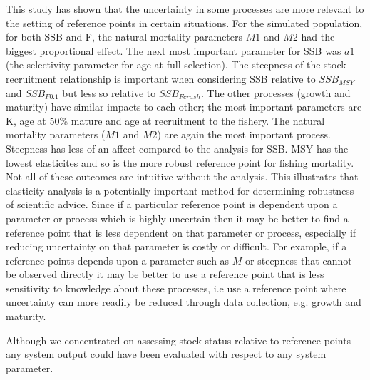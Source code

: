 \documentclass{pnastwo}
\begin{document}
\begin{article}
This study has shown that the uncertainty in some processes are more relevant to
the setting of reference points in certain situations. For the simulated population,
for both SSB and F, the natural mortality parameters $M1$ and $M2$ had the biggest
proportional effect. The next most important parameter for SSB was $a1$ (the selectivity
parameter for age at full selection). The steepness of the stock recruitment relationship
is important when considering SSB relative to $SSB_{MSY}$ and $SSB_{F0.1}$ but less
so relative to $SSB_{Fcrash}$. The other processes (growth and maturity) have similar
impacts to each other; the most important parameters are K, age at 50\% mature and age
at recruitment to the fishery. The natural mortality parameters ($M1$ and $M2$) are
again the most important process. Steepness has less of an affect compared to the
analysis for SSB. MSY has the lowest elasticites and so is the more robust reference
point for fishing mortality. Not all of these outcomes are intuitive without the analysis.
This illustrates that elasticity analysis is a potentially important method for
determining robustness of scientific advice. Since if a particular reference point
is dependent upon a parameter or process which is highly uncertain then it may be
better to find a reference point that is less dependent on that parameter or process,
especially if reducing uncertainty on that parameter is costly or difficult.
For example, if a reference points depends upon a parameter such as $M$ or steepness
that cannot be observed directly it may be better to use a reference point that is
less sensitivity to knowledge about these processes, i.e use a reference point where
uncertainty can more readily be reduced through data collection, e.g. growth and maturity.

Although we concentrated on assessing stock status relative
to reference points any system output could have been evaluated with respect to any system
parameter.


\end{article}
\end{document}
